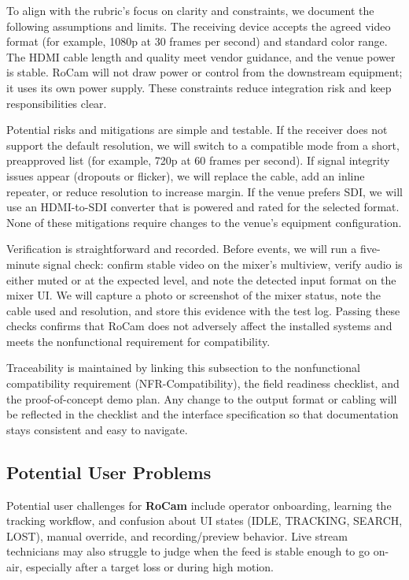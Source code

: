 \documentclass[12pt]{article}
\begin{document}
To align with the rubric’s focus on clarity and constraints, we document the
following assumptions and limits. The receiving device accepts the agreed video
format (for example, 1080p at 30 frames per second) and standard color range.
The HDMI cable length and quality meet vendor guidance, and the venue power is
stable. RoCam will not draw power or control from the downstream equipment; it
uses its own power supply. These constraints reduce integration risk and keep
responsibilities clear.

Potential risks and mitigations are simple and testable. If the receiver does
not support the default resolution, we will switch to a compatible mode from a
short, preapproved list (for example, 720p at 60 frames per second). If signal
integrity issues appear (dropouts or flicker), we will replace the cable, add
an inline repeater, or reduce resolution to increase margin. If the venue
prefers SDI, we will use an HDMI-to-SDI converter that is powered and rated for
the selected format. None of these mitigations require changes to the venue’s
equipment configuration.

Verification is straightforward and recorded. Before events, we will run a
five-minute signal check: confirm stable video on the mixer’s multiview, verify
audio is either muted or at the expected level, and note the detected input
format on the mixer UI. We will capture a photo or screenshot of the mixer
status, note the cable used and resolution, and store this evidence with the
test log. Passing these checks confirms that RoCam does not adversely affect
the installed systems and meets the nonfunctional requirement for
compatibility.

Traceability is maintained by linking this subsection to the nonfunctional
compatibility requirement (NFR-Compatibility), the field readiness checklist,
and the proof-of-concept demo plan. Any change to the output format or cabling
will be reflected in the checklist and the interface specification so that
documentation stays consistent and easy to navigate.


\subsection{Potential User Problems}

Potential user challenges for \textbf{RoCam} include operator onboarding,
learning the tracking workflow, and confusion about UI states (IDLE, TRACKING,
SEARCH, LOST), manual override, and recording/preview behavior. Live stream
technicians may also struggle to judge when the feed is stable enough to go
on-air, especially after a target loss or during high motion.
\end{document}
